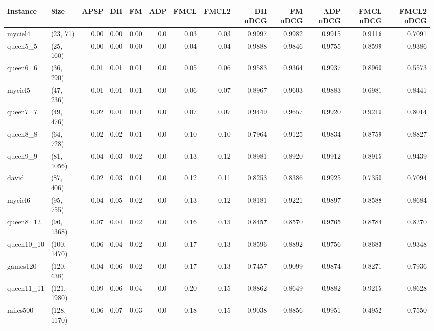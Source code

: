 \begin{tabular}{llrrrrrrrrrrr}
\toprule
  Instance &         Size &  APSP &   DH &   FM &  ADP &  FMCL &  FMCL2 &  DH nDCG &  FM nDCG &  ADP nDCG &  FMCL nDCG &  FMCL2 nDCG \\
\midrule
   myciel4 &     (23, 71) &  0.00 & 0.00 & 0.00 &  0.0 &  0.03 &   0.03 &   0.9997 &   0.9982 &    0.9915 &     0.9116 &      0.7091 \\
  queen5\_5 &    (25, 160) &  0.00 & 0.00 & 0.00 &  0.0 &  0.04 &   0.04 &   0.9888 &   0.9846 &    0.9755 &     0.8599 &      0.9386 \\
  queen6\_6 &    (36, 290) &  0.01 & 0.01 & 0.01 &  0.0 &  0.05 &   0.06 &   0.9583 &   0.9364 &    0.9937 &     0.8960 &      0.5573 \\
   myciel5 &    (47, 236) &  0.01 & 0.01 & 0.01 &  0.0 &  0.06 &   0.07 &   0.8967 &   0.9603 &    0.9883 &     0.6981 &      0.8441 \\
  queen7\_7 &    (49, 476) &  0.02 & 0.01 & 0.01 &  0.0 &  0.07 &   0.07 &   0.9449 &   0.9657 &    0.9920 &     0.9210 &      0.8014 \\
  queen8\_8 &    (64, 728) &  0.02 & 0.02 & 0.01 &  0.0 &  0.10 &   0.10 &   0.7964 &   0.9125 &    0.9834 &     0.8759 &      0.8827 \\
  queen9\_9 &   (81, 1056) &  0.04 & 0.03 & 0.02 &  0.0 &  0.13 &   0.12 &   0.8981 &   0.8920 &    0.9912 &     0.8915 &      0.9439 \\
     david &    (87, 406) &  0.02 & 0.03 & 0.01 &  0.0 &  0.12 &   0.11 &   0.8253 &   0.8386 &    0.9925 &     0.7350 &      0.7094 \\
   myciel6 &    (95, 755) &  0.04 & 0.05 & 0.02 &  0.0 &  0.13 &   0.12 &   0.8181 &   0.9221 &    0.9897 &     0.8588 &      0.8684 \\
 queen8\_12 &   (96, 1368) &  0.07 & 0.04 & 0.02 &  0.0 &  0.16 &   0.13 &   0.8457 &   0.8570 &    0.9765 &     0.8784 &      0.8270 \\
queen10\_10 &  (100, 1470) &  0.06 & 0.04 & 0.02 &  0.0 &  0.17 &   0.13 &   0.8596 &   0.8892 &    0.9756 &     0.8683 &      0.9348 \\
  games120 &   (120, 638) &  0.04 & 0.06 & 0.02 &  0.0 &  0.17 &   0.13 &   0.7457 &   0.9099 &    0.9874 &     0.8271 &      0.7936 \\
queen11\_11 &  (121, 1980) &  0.09 & 0.06 & 0.04 &  0.0 &  0.20 &   0.15 &   0.8862 &   0.8649 &    0.9882 &     0.9215 &      0.8628 \\
  miles500 &  (128, 1170) &  0.06 & 0.07 & 0.03 &  0.0 &  0.18 &   0.15 &   0.9038 &   0.8856 &    0.9951 &     0.4952 &      0.7550 \\

\end{tabular}
